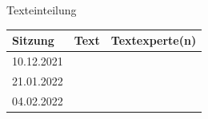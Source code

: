 \documentclass[11pt]{beamer}
\begin{document}
\begin{frame}[t]{Texteinteilung}
	\begin{center}	
		\begin{table}
			\begin{tabular}{l l l}
			\toprule[2pt]
			Sitzung & Text & Textexperte(n)\\
			\midrule
			\multirow{4}{*}{10.12.2021} & \cite{vanDeth2004} & \\
			\cmidrule{2-3}
			& \cite{Westle2020} & \\
			\cmidrule{2-3}
			& \cite{Reichert2019} & \\
			\cmidrule{2-3}
			& \cite{Russo2017} & \\
			\midrule
			\multirow{2}{*}{21.01.2022} & \cite[Kap. 1]{Welzel2013} & \\
			\cmidrule{2-3}
			& \cite{Inglehart2010} \\
			\midrule
			04.02.2022 & \cite[Kap. 10]{Welzel2013} & \\
			\bottomrule[2pt]
			
			\end{tabular}
		\end{table}
	\end{center}
\end{frame}
\end{document}
